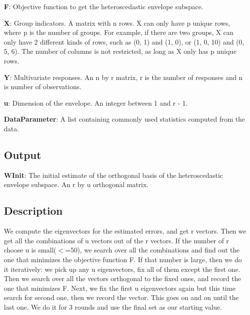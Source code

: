 \documentclass[a4paper,11pt,openany]{memoir}
\begin{document}
\begin{par}
\textbf{F}: Objective function to get the heteroscedastic envelope subspace.
\end{par} \vspace{1em}
\begin{par}
\textbf{X}: Group indicators. A matrix with n rows.  X can only have p unique  rows, where p is the number of groups. For example, if there are two groups, X can only have 2 different kinds of rows, such as (0, 1) and (1, 0), or (1, 0, 10) and (0, 5, 6).  The number of columns is not restricted, as long as X only has p unique rows.
\end{par} \vspace{1em}
\begin{par}
\textbf{Y}: Multivariate responses. An n by r matrix, r is the number of responses and n is number of observations.
\end{par} \vspace{1em}
\begin{par}
\textbf{u}: Dimension of the envelope. An integer between 1 and r - 1.
\end{par} \vspace{1em}
\begin{par}
\textbf{DataParameter}: A list containing commonly used statistics computed from the data.
\end{par} \vspace{1em}


\subsection*{Output}

\begin{par}
\textbf{WInit}: The initial estimate of the orthogonal basis of the heteroscedastic envelope subspace. An r by u orthogonal matrix.
\end{par} \vspace{1em}


\subsection*{Description}

\begin{par}
We compute the eigenvectors for the estimated errors, and get r vectors.  Then we get all the combinations of u vectors out of the r vectors. If the number of r choose u is small(\ensuremath{<}=50), we search over all the combinations and find out the one that minimizes the objective function F. If that number is large, then we do it iteratively: we pick up any u eigenvectors, fix all of them except the first one. Then we search over all the vectors orthogonal to the fixed ones, and record the one that minimizes F. Next, we fix the first u eigenvectors again but this time search for second one, then we record the vector. This goes on and on until the last one. We do it for 3 rounds and use the final set as our starting value.
\end{par} \vspace{1em}
\end{document}
